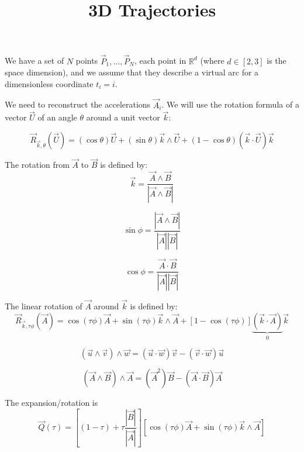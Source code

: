 \documentclass[aps,12pt]{revtex4}
\begin{document}
\title{3D Trajectories}
\maketitle
	
We have a set of $N$ points $\vec{P}_1,\ldots,\vec{P}_N$, each point in $\mathbb{R}^d$ (where $d\in[2,3]$ is the space dimension), and we assume
that they describe a virtual arc for a dimensionless coordinate $t_i=i$.

We need to reconstruct the accelerations $\vec{A}_i$.
We will use the rotation formula of a vector $\vec{U}$ of an angle $\theta$ around a unit vector $\vec{k}$:

\begin{equation}
	\vec{R}_{\vec{k},\theta}(\vec{U})=	 \left(\cos \theta\right) \vec{U}
	+ \left(\sin \theta\right) \vec{k} \wedge\vec{U} 
	+ \left(1-\cos\theta\right) \left(\vec{k}\cdot\vec{U}\right)\vec{k}
\end{equation}

The rotation from $\vec{A}$ to $\vec{B}$ is defined by:
\begin{equation}
	\vec{k} = \dfrac{\vec{A}\wedge\vec{B}}{\left|\vec{A}\wedge\vec{B} \right|}
\end{equation}

\begin{equation}
	\sin \phi =  \dfrac{\left|\vec{A}\wedge\vec{B} \right|}{\left|\vec{A}\right| \left|\vec{B}\right|}
\end{equation}

\begin{equation}
	\cos \phi = \dfrac{ \vec{A} \cdot \vec{B} }{ \left|\vec{A}\right| \left|\vec{B}\right| }
\end{equation}

The linear rotation of $\vec{A}$ around $\vec{k}$ is defined by:
\begin{equation}
 \vec{R}_{\vec{k},\tau\phi}(\vec{A}) = \cos(\tau\phi) \vec{A} + \sin(\tau\phi) \vec{k} \wedge \vec{A} + \left[1-\cos(\tau\phi)\right] \underbrace{\left(\vec{k}\cdot\vec{A}\right)}_{0}\vec{k}
\end{equation}

\begin{equation}
	\left(\vec{u}\wedge\vec{v}\right)\wedge\vec{w} = \left(\vec{u}\cdot\vec{w}\right) \vec{v} - \left(\vec{v}\cdot\vec{w}\right) \vec{u}
\end{equation}

\begin{equation}
	\left(\vec{A}\wedge\vec{B}\right)\wedge\vec{A} = \left(\vec{A}^2\right) \vec{B} - \left(\vec{A}\cdot\vec{B}\right) \vec{A}
\end{equation}

The expansion/rotation is
\begin{equation}
	\vec{Q}(\tau) = 
	\left[ (1-\tau) + \tau \dfrac{\left| \vec{B}\right|}{\left|\vec{A}\right|}\right] 
	\left[ \cos(\tau\phi) \vec{A} + \sin(\tau\phi) \vec{k} \wedge \vec{A} \right]
\end{equation}
\end{document}
